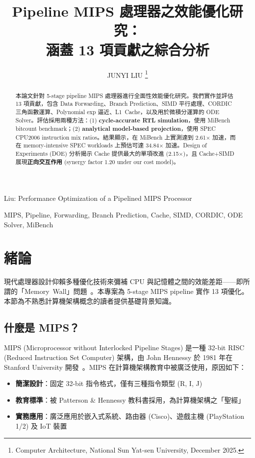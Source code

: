 \documentclass[journal]{IEEEtran}
\begin{document}
\title{Pipeline MIPS 處理器之效能優化研究：\\涵蓋 13 項貢獻之綜合分析}

\author{JUNYI LIU
\thanks{Computer Architecture, National Sun Yat-sen University, December 2025.}}

%
{Liu: Performance Optimization of a Pipelined MIPS Processor}

\maketitle

\begin{abstract}
本論文針對 5-stage pipeline MIPS 處理器進行全面性效能優化研究。我們實作並評估 13 項貢獻，包含 Data Forwarding、Branch Prediction、SIMD 平行處理、CORDIC 三角函數運算、Polynomial exp 逼近、L1~Cache，以及用於微積分運算的 ODE Solver。評估採用兩種方法：(1) \textbf{cycle-accurate RTL simulation}，使用 MiBench bitcount benchmark；(2) \textbf{analytical model-based projection}，使用 SPEC CPU2006 instruction mix ratios。結果顯示，在 MiBench 上實測達到 2.61$\times$ 加速，而在 memory-intensive SPEC workloads 上預估可達 34.84$\times$ 加速。Design of Experiments (DOE) 分析揭示 Cache 提供最大的單項改進 (2.15$\times$)，且 Cache+SIMD 展現\textbf{正向交互作用} (synergy factor 1.20 under our cost model)。
\end{abstract}

\begin{IEEEkeywords}
MIPS, Pipeline, Forwarding, Branch Prediction, Cache, SIMD, CORDIC, ODE Solver, MiBench
\end{IEEEkeywords}

\section{緒論}
現代處理器設計仰賴多種優化技術來彌補 CPU 與記憶體之間的效能差距——即所謂的「Memory~Wall」問題~\cite{hennessy2017computer}。本專案為 5-stage MIPS pipeline 實作 13 項優化。本節為不熟悉計算機架構概念的讀者提供基礎背景知識。

\subsection{什麼是 MIPS？}
MIPS (Microprocessor without Interlocked Pipeline Stages) 是一種 32-bit RISC (Reduced Instruction Set Computer) 架構，由 John Hennessy 於 1981 年在 Stanford University 開發~\cite{patterson2020computer}。MIPS 在計算機架構教育中被廣泛使用，原因如下：
\begin{itemize}
    \item \textbf{簡潔設計}：固定 32-bit 指令格式，僅有三種指令類型 (R, I, J)
    \item \textbf{教育標準}：被 Patterson \& Hennessy 教科書採用，為計算機架構之「聖經」
    \item \textbf{實務應用}：廣泛應用於嵌入式系統、路由器 (Cisco)、遊戲主機 (PlayStation 1/2) 及 IoT 裝置
\end{itemize}
\end{document}
